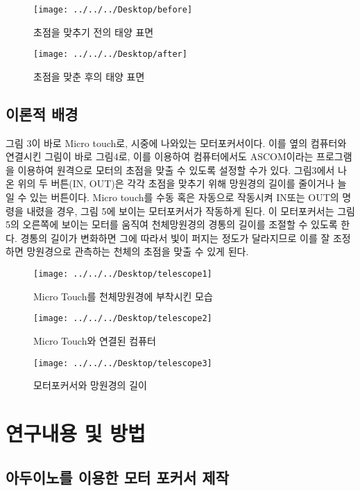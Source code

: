 \documentclass{abstract_hutech}
\begin{document}
\begin{figure}
\centering
\texttt{[image: ../../../Desktop/before]}
\caption{초점을 맞추기 전의 태양 표면}
\label{fig:before}
\end{figure}

\begin{figure}
\centering
\texttt{[image: ../../../Desktop/after]}
\caption{초점을 맞춘 후의 태양 표면}
\label{fig:after}
\end{figure}

\subsection{이론적 배경}

그림 3이 바로 Micro touch로, 시중에 나와있는 모터포커서이다. 이를 옆의 컴퓨터와 연결시킨 그림이 바로 그림4로, 이를 이용하여 컴퓨터에서도 ASCOM이라는 프로그램을 이용하여 원격으로 모터의 초점을 맞출 수 있도록 설정할 수가 있다. 그림3에서 나온 위의 두 버튼(IN, OUT)은 각각 초점을 맞추기 위해 망원경의 길이를 줄이거나 늘일 수 있는 버튼이다. Micro touch를 수동 혹은 자동으로 작동시켜 IN또는 OUT의 명령을 내렸을 경우, 그림 5에 보이는 모터포커서가 작동하게 된다. 이 모터포커서는 그림 5의 오른쪽에 보이는 모터를 움직여 천체망원경의 경통의 길이를 조절할 수 있도록 한다. 경통의 길이가 변화하면 그에 따라서 빛이 퍼지는 정도가 달라지므로 이를 잘 조정하면 망원경으로 관측하는 천체의 초점을 맞출 수 있게 된다.
\begin{figure}
\centering
\texttt{[image: ../../../Desktop/telescope1]}
\caption{Micro Touch를 천체망원경에 부착시킨 모습}
\label{fig:telescope1}
\end{figure}

\begin{figure}
\centering
\texttt{[image: ../../../Desktop/telescope2]}
\caption{Micro Touch와 연결된 컴퓨터}
\label{fig:telescope2}
\end{figure}

\begin{figure}
\centering
\texttt{[image: ../../../Desktop/telescope3]}
\caption{모터포커서와 망원경의 길이}
\label{fig:telescope3}
\end{figure}

\section{연구내용 및 방법}

\subsection{아두이노를 이용한 모터 포커서 제작}
\end{document}
